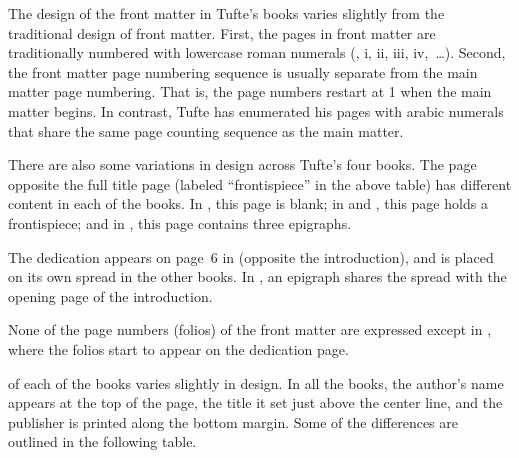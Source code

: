 \bigskip
The design of the front matter in Tufte's books varies slightly from the
traditional design of front matter.  First, the pages in front matter are
traditionally numbered with lowercase roman numerals (\eg, i, ii, iii,
iv,~\ldots).  Second, the front matter page numbering sequence is usually
separate from the main matter page numbering.  That is, the page numbers
restart at 1 when the main matter begins.  In contrast, Tufte has
enumerated his pages with arabic numerals that share the same page counting
sequence as the main matter.  

There are also some variations in design across Tufte's four books.  The
page opposite the full title page (labeled ``frontispiece'' in the above
table) has different content in each of the books.  In \VDQI, this page is
blank; in \EI and \VE, this page holds a frontispiece; and in \BE, this
page contains three epigraphs.

The dedication appears on page~6 in \vdqi (opposite the introduction), and
is placed on its own spread in the other books.  In \ve, an epigraph shares
the spread with the opening page of the introduction.

None of the page numbers (folios) of the front matter are expressed except in
\be, where the folios start to appear on the dedication page.

 of each of the books varies slightly in
design.  In all the books, the author's name appears at the top of the
page, the title it set just above the center line, and the publisher is
printed along the bottom margin.  Some of the differences are outlined in
the following table.

